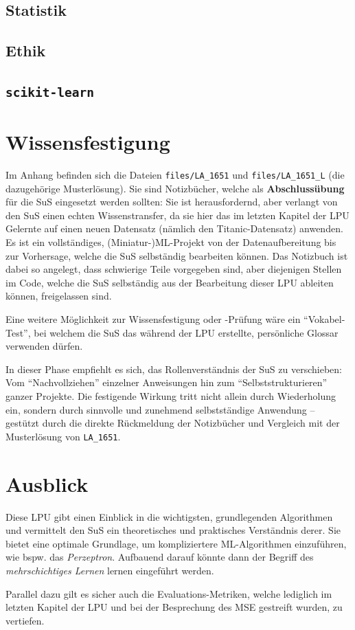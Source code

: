 \documentclass[twocolumn]{article}
\begin{document}
\subsection{Statistik}
\label{sec:stats}


\subsection{Ethik}


\subsection{\texttt{scikit-learn}}
\label{sec:last}


\section{Wissensfestigung}
\label{sec:wissensfestigung}

Im Anhang befinden sich die Dateien \texttt{files/LA\_1651} und \texttt{files/LA\_1651\_L} (die dazugehörige Musterlösung). Sie sind Notizbücher, welche als \textbf{Abschlussübung} für die SuS eingesetzt werden sollten: Sie ist herausfordernd, aber verlangt von den SuS einen echten Wissenstransfer, da sie hier das im letzten Kapitel der LPU Gelernte auf einen neuen Datensatz (nämlich den Titanic-Datensatz) anwenden. Es ist ein vollständiges, (Miniatur-)ML-Projekt von der Datenaufbereitung bis zur Vorhersage, welche die SuS selbständig bearbeiten können. Das Notizbuch ist dabei so angelegt, dass schwierige Teile vorgegeben sind, aber diejenigen Stellen im Code, welche die SuS selbständig aus der Bearbeitung dieser LPU ableiten können, freigelassen sind. 


Eine weitere Möglichkeit zur Wissensfestigung oder -Prüfung wäre ein ``Vokabel-Test'', bei welchem die SuS das während der LPU erstellte, persönliche Glossar verwenden dürfen.

In dieser Phase empfiehlt es sich, das Rollenverständnis der SuS zu verschieben: Vom ``Nachvollziehen'' einzelner Anweisungen hin zum ``Selbststrukturieren'' ganzer Projekte. Die festigende Wirkung tritt nicht allein durch Wiederholung ein, sondern durch sinnvolle und zunehmend selbstständige Anwendung – gestützt durch die direkte Rückmeldung der Notizbücher und Vergleich mit der Musterlösung von \texttt{LA\_1651}.

\newpage
\section{Ausblick}
\label{sec:abschluss}

Diese LPU gibt einen Einblick in die wichtigsten, grundlegenden Algorithmen und vermittelt den SuS ein theoretisches und praktisches Verständnis derer. Sie bietet eine optimale Grundlage, um kompliziertere ML-Algorithmen einzuführen, wie bspw. das \textit{Perzeptron}. Aufbauend darauf könnte dann der Begriff des \textit{mehrschichtiges Lernen} lernen eingeführt werden.

Parallel dazu gilt es sicher auch die Evaluations-Metriken, welche lediglich im letzten Kapitel der LPU und bei der Besprechung des MSE gestreift wurden, zu vertiefen. 
\end{document}
